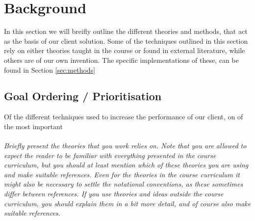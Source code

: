 \section{Background}
\label{sec:background}

In this section we will breifly outline the different theories and methods, that act as the basis of our client solution. Some of the techniques outlined in this section rely on either theories taught in the course or found in external literature, while others are of our own invention. The specific implementations of these, can be found in Section \ref{sec:methods}

\subsection{Goal Ordering / Prioritisation}
Of the different techniques used to increase the performance of our client, on of the most important 
\\\\


\emph{Briefly present the theories that you work relies on. Note that you are allowed to expect the reader to be familiar with everything presented in the course curriculum, but you should at least mention which of these theories you are using and make suitable references. Even for the theories in the course curriculum it might also be necessary to settle the notational conventions, as these sometimes differ between references. If you use theories and ideas outside the course curriculum, you should explain them in a bit more detail, and of course also make suitable references.}
